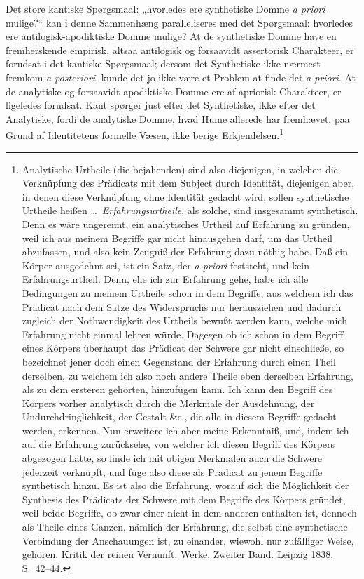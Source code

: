 \documentclass[12pt]{book}
\begin{document}
Det store kantiske Spørgsmaal: „hvorledes ere synthetiske Domme \textit{a priori} mulige?“ kan i denne Sammenhæng paralleliseres med det Spørgsmaal: hvorledes ere antilogisk-apodiktiske Domme mulige? At de synthetiske Domme have en fremherskende empirisk, altsaa antilogisk og forsaavidt assertorisk Charakteer, er forudsat i det kantiske Spørgsmaal; dersom det Synthetiske ikke nærmest fremkom \textit{a posteriori}, kunde det jo ikke være et Problem at finde det \textit{a priori}. At de analytiske og forsaavidt apodiktiske Domme ere af apriorisk Charakteer, er ligeledes forudsat. Kant spørger just efter det Synthetiske, ikke efter det Analytiske, fordi de analytiske Domme, hvad Hume allerede har fremhævet, paa Grund af Identitetens formelle Væsen, ikke berige Erkjendelsen.\footnote{Analytische Urtheile (die bejahenden) sind also diejenigen, in welchen die Verknüpfung des Prädicats mit dem Subject durch Identität, diejenigen aber, in denen diese Verknüpfung ohne Identität gedacht wird, sollen synthetische Urtheile heißen \dots\ \emph{Erfahrungsurtheile}, als solche, sind insgesammt synthetisch. Denn es wäre ungereimt, ein analytisches Urtheil auf Erfahrung zu gründen, weil ich aus meinem Begriffe gar nicht hinausgehen darf, um das Urtheil abzufassen, und also kein Zeugniß der Erfahrung dazu nöthig habe. Daß ein Körper ausgedehnt sei, ist ein Satz, der \textit{a priori} feststeht, und kein Erfahrungsurtheil. Denn, ehe ich zur Erfahrung gehe, habe ich alle Bedingungen zu meinem Urtheile schon in dem Begriffe, aus welchem ich das Prädicat nach dem Satze des Widerspruchs nur herausziehen und dadurch zugleich der Nothwendigkeit des Urtheils bewußt
werden kann, welche mich Erfahrung nicht einmal lehren würde. Dagegen ob ich schon in dem Begriff eines Körpers überhaupt das Prädicat der Schwere gar nicht einschließe, so bezeichnet jener doch einen Gegenstand der Erfahrung durch einen Theil derselben, zu welchem ich also noch andere Theile eben derselben Erfahrung, als zu dem ersteren gehörten, hinzufügen kann. Ich kann den Begriff des Körpers vorher analytisch durch die Merkmale der Ausdehnung, der Undurchdringlichkeit, der Gestalt \&c.,
die alle in diesem Begriffe gedacht werden, erkennen. Nun erweitere ich aber meine Erkenntniß, und, indem ich auf die Erfahrung zurücksehe, von welcher ich diesen Begriff des Körpers abgezogen hatte, so finde ich mit obigen Merkmalen auch die Schwere jederzeit verknüpft, und füge also diese als Prädicat zu jenem Begriffe synthetisch hinzu. Es ist also die Erfahrung, worauf sich die Möglichkeit der Synthesis des Prädicats der Schwere mit dem Begriffe des Körpers gründet, weil beide Begriffe, ob zwar einer nicht in dem anderen enthalten ist, dennoch als Theile eines Ganzen, nämlich der Erfahrung, die selbst eine synthetische Verbindung der Anschauungen ist, zu einander, wiewohl nur zufälliger Weise, gehören. Kritik der reinen Vernunft. Werke. Zweiter Band. Leipzig 1838. S.~42--44.}%
\end{document}
